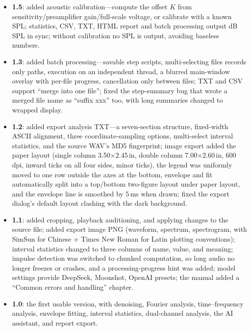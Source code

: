 \documentclass[UTF8,a4paper,12pt]{ctexart}
\begin{document}
\begin{itemize}
  \item \textbf{1.5}: added acoustic calibration---compute the offset $K$ from sensitivity/preamplifier gain/full-scale voltage, or calibrate with a known SPL; statistics, CSV, TXT, HTML report and batch processing output dB SPL in sync; without calibration no SPL is output, avoiding baseless numbers.
  \item \textbf{1.3}: added batch processing---savable step scripts, multi-selecting files records only paths, execution on an independent thread, a blurred main-window overlay with per-file progress, cancellation only between files; TXT and CSV support ``merge into one file''; fixed the step-summary bug that wrote a merged file name as ``suffix xxx'' too, with long summaries changed to wrapped display.
  \item \textbf{1.2}: added export analysis TXT---a seven-section structure, fixed-width ASCII alignment, three coordinate-sampling options, multi-select interval statistics, and the source WAV's MD5 fingerprint; image export added the paper layout (single column 3.50$\times$2.45\,in, double column 7.00$\times$2.60\,in, 600 dpi, inward ticks on all four sides, minor ticks), the legend was uniformly moved to one row outside the axes at the bottom, envelope and fit automatically split into a top/bottom two-figure layout under paper layout, and the envelope line is smoothed by 5\,ms when drawn; fixed the export dialog's default layout clashing with the dark background.
  \item \textbf{1.1}: added cropping, playback auditioning, and applying changes to the source file; added export image PNG (waveform, spectrum, spectrogram, with SimSun for Chinese + Times New Roman for Latin plotting conventions); interval statistics changed to three columns of name, value, and meaning; impulse detection was switched to chunked computation, so long audio no longer freezes or crashes, and a processing-progress hint was added; model settings provide DeepSeek, Moonshot, OpenAI presets; the manual added a ``Common errors and handling'' chapter.
  \item \textbf{1.0}: the first usable version, with denoising, Fourier analysis, time--frequency analysis, envelope fitting, interval statistics, dual-channel analysis, the AI assistant, and report export.
\end{itemize}
\end{document}
